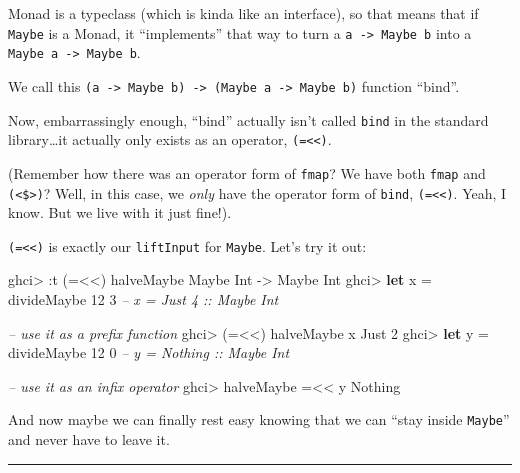 \documentclass[]{article}
\newenvironment{Shaded}{}{}
\newcommand{\KeywordTok}[1]{\textcolor[rgb]{0.00,0.44,0.13}{\textbf{{#1}}}}
\newcommand{\DataTypeTok}[1]{\textcolor[rgb]{0.56,0.13,0.00}{{#1}}}
\newcommand{\DecValTok}[1]{\textcolor[rgb]{0.25,0.63,0.44}{{#1}}}
\newcommand{\CommentTok}[1]{\textcolor[rgb]{0.38,0.63,0.69}{\textit{{#1}}}}
\newcommand{\OtherTok}[1]{\textcolor[rgb]{0.00,0.44,0.13}{{#1}}}
\newcommand{\FunctionTok}[1]{\textcolor[rgb]{0.02,0.16,0.49}{{#1}}}
\newcommand{\NormalTok}[1]{{#1}}
\begin{document}
Monad is a typeclass (which is kinda like an interface), so that means
that if \texttt{Maybe} is a Monad, it ``implements'' that way to turn a
\texttt{a\ -\textgreater{}\ Maybe\ b} into a
\texttt{Maybe\ a\ -\textgreater{}\ Maybe\ b}.

We call this
\texttt{(a\ -\textgreater{}\ Maybe\ b)\ -\textgreater{}\ (Maybe\ a\ -\textgreater{}\ Maybe\ b)}
function ``bind''.

Now, embarrassingly enough, ``bind'' actually isn't called \texttt{bind}
in the standard library\ldots{}it actually only exists as an operator,
\texttt{(=\textless{}\textless{})}.

(Remember how there was an operator form of \texttt{fmap}? We have both
\texttt{fmap} and \texttt{(\textless{}\$\textgreater{})}? Well, in this
case, we \emph{only} have the operator form of \texttt{bind},
\texttt{(=\textless{}\textless{})}. Yeah, I know. But we live with it
just fine!).

\texttt{(=\textless{}\textless{})} is exactly our \texttt{liftInput} for
\texttt{Maybe}. Let's try it out:

\begin{Shaded}
\begin{Highlighting}[]
\NormalTok{ghci}\FunctionTok{>} \FunctionTok{:}\NormalTok{t (}\FunctionTok{=<<}\NormalTok{) halveMaybe}
\DataTypeTok{Maybe} \DataTypeTok{Int} \OtherTok{->} \DataTypeTok{Maybe} \DataTypeTok{Int}
\NormalTok{ghci}\FunctionTok{>} \KeywordTok{let} \NormalTok{x }\FunctionTok{=} \NormalTok{divideMaybe }\DecValTok{12} \DecValTok{3}     \CommentTok{-- x = Just 4 :: Maybe Int}

\CommentTok{-- use it as a prefix function}
\NormalTok{ghci}\FunctionTok{>} \NormalTok{(}\FunctionTok{=<<}\NormalTok{) halveMaybe x}
\DataTypeTok{Just} \DecValTok{2}
\NormalTok{ghci}\FunctionTok{>} \KeywordTok{let} \NormalTok{y }\FunctionTok{=} \NormalTok{divideMaybe }\DecValTok{12} \DecValTok{0}     \CommentTok{-- y = Nothing :: Maybe Int}

\CommentTok{-- use it as an infix operator}
\NormalTok{ghci}\FunctionTok{>} \NormalTok{halveMaybe }\FunctionTok{=<<} \NormalTok{y}
\DataTypeTok{Nothing}
\end{Highlighting}
\end{Shaded}

And now maybe we can finally rest easy knowing that we can ``stay inside
\texttt{Maybe}'' and never have to leave it.

\begin{center}\rule{0.5\linewidth}{\linethickness}\end{center}
\end{document}
